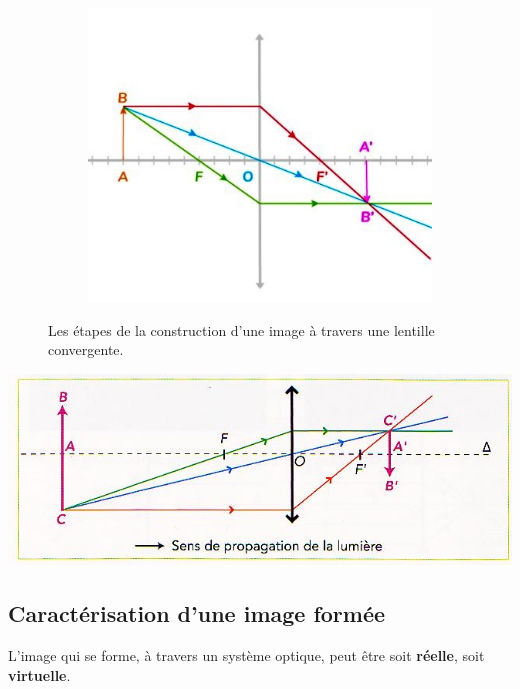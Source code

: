 \documentclass[11pt,a4paper]{article}
\begin{document}
\begin{figure}[ht]
\begin{subfigure}{.18\textwidth}
  \includegraphics[width=.95\linewidth]{imgs/p6/constrct5.jpg}  
\end{subfigure}
\caption{Les étapes de la construction d'une image à travers une lentille convergente.}
\end{figure}
\newpage
\begin{eg}
\begin{center}
    \includegraphics[width=\textwidth]{imgs/p6/imageconstruct.jpg}    
\end{center}
\end{eg}

\subsection{Caractérisation d'une image formée}

L'image qui se forme, à travers un système optique, peut être soit \textbf{réelle}, soit \textbf{virtuelle}. 
\end{document}
